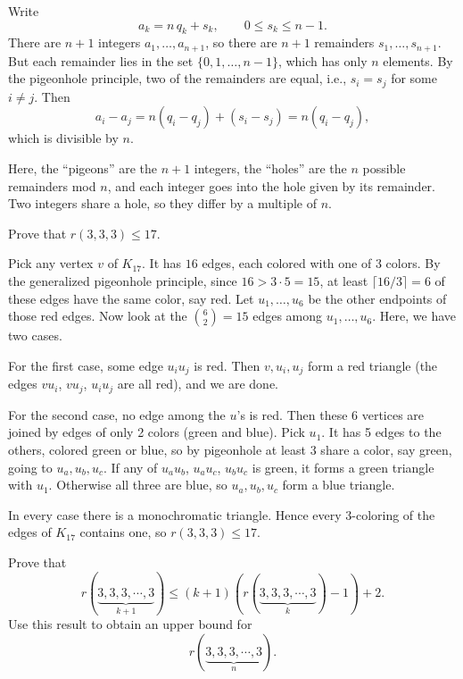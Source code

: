 \begin{solution}
  Write
  \[%
    a_k = n\,q_k + s_k, \qquad 0 \le s_k \le n-1
  .\]%
  There are $n+1$ integers $a_1, \dots, a_{n+1}$, so there are $n+1$ remainders $s_1, \dots, s_{n+1}$. But each remainder lies in the set $\{0, 1, \dots, n-1\}$, which has only $n$ elements. By the pigeonhole principle, two of the remainders are equal, i.e., $s_i = s_j$ for some $i \ne j$. Then
  \[%
    a_i - a_j = n(q_i - q_j) + (s_i - s_j) = n(q_i - q_j)
  ,\]%
  which is divisible by $n$.

  Here, the ``pigeons'' are the $n+1$ integers, the ``holes'' are the $n$ possible remainders mod $n$, and each integer goes into the hole given by its remainder. Two integers share a hole, so they differ by a multiple of $n$.
\end{solution}

\begin{problem}[20]
  Prove that $r(3, 3, 3) \le 17$.
\end{problem}

\begin{solution}
  Pick any vertex $v$ of $K_{17}$. It has $16$ edges, each colored with one of 3 colors. By the generalized pigeonhole principle, since $16 > 3\cdot 5 = 15$, at least $\lceil 16/3\rceil = 6$ of these edges have the same color, say red. Let $u_1, \dots, u_6$ be the other endpoints of those red edges. Now look at the $\binom{6}{2}=15$ edges among $u_1,\dots,u_6$. Here, we have two cases.

  For the first case, some edge $u_iu_j$ is red. Then $v, u_i, u_j$ form a red triangle (the edges $vu_i$, $vu_j$, $u_iu_j$ are all red), and we are done.

  For the second case, no edge among the $u$'s is red. Then these 6 vertices are joined by edges of only 2 colors (green and blue). Pick $u_1$. It has 5 edges to the others, colored green or blue, so by pigeonhole at least $3$ share a color, say green, going to $u_a, u_b, u_c$. If any of $u_au_b$, $u_au_c$, $u_bu_c$ is green, it forms a green triangle with $u_1$. Otherwise all three are blue, so $u_a, u_b, u_c$ form a blue triangle.

  In every case there is a monochromatic triangle. Hence every 3-coloring of the edges of $K_{17}$ contains one, so $r(3,3,3)\le 17$.
\end{solution}

\begin{problem}[22]
  Prove that
  \[%
    r(\underbrace{3, 3, 3, \cdots, 3}_{k+1}) \le (k + 1)(r(\underbrace{3, 3, 3, \cdots, 3}_{k}) - 1) + 2
  .\]%
  Use this result to obtain an upper bound for
  \[%
    r(\underbrace{3, 3, 3, \cdots, 3}_{n})
  .\]%
\end{problem}

